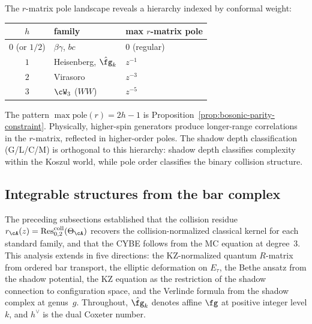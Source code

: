 \begin{remark}
\label{rem:pole-hierarchy-conformal-weight}
The $r$-matrix pole landscape reveals a hierarchy indexed by
conformal weight:
\begin{center}
\renewcommand{\arraystretch}{1.1}
\begin{tabular}{cll}
$h$ & family & max $r$-matrix pole \\
\midrule
$0$ (or $1/2$) & $\beta\gamma$, $bc$ & $0$ (regular) \\
$1$ & Heisenberg, $\hat\fg_k$ & $z^{-1}$ \\
$2$ & Virasoro & $z^{-3}$ \\
$3$ & $\cW_3$ ($WW$) & $z^{-5}$
\end{tabular}
\end{center}
The pattern $\max\text{pole}(r) = 2h - 1$ is
Proposition~\ref{prop:bosonic-parity-constraint}.
Physically, higher-spin generators produce longer-range correlations
in the $r$-matrix, reflected in higher-order poles. The shadow depth
classification (G/L/C/M) is orthogonal to this hierarchy: shadow depth
classifies complexity within the Koszul world, while pole order
classifies the binary collision structure.
\end{remark}


\subsection{Integrable structures from the bar complex}
\label{subsec:integrable-structures-bar-complex}

The preceding subsections established that the collision residue
$r_\cA(z) = \operatorname{Res}^{\mathrm{coll}}_{0,2}(\Theta_\cA)$
recovers the collision-normalized classical kernel for each standard
family,
and that the CYBE follows from the MC equation at degree~$3$.
This analysis extends in five directions: the KZ-normalized quantum
$R$-matrix from ordered bar transport, the elliptic deformation on
$E_\tau$, the Bethe ansatz from the shadow potential, the KZ
equation as the restriction of the shadow connection to
configuration space, and the Verlinde formula from the shadow
complex at genus~$g$. Throughout, $\hat\fg_k$ denotes affine
$\fg$ at positive integer level $k$, and $h^\vee$ is the dual
Coxeter number.

